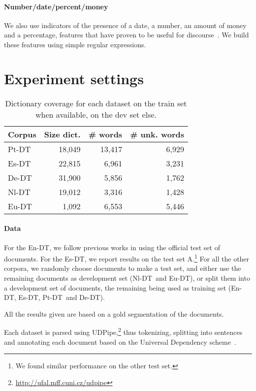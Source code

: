 \documentclass[11pt]{article}
\newcommand{\erstdt}{En-DT}
\newcommand{\derst}{De-DT}
\newcommand{\ptrst}{Pt-DT}
\newcommand{\eurst}{Eu-DT}
\newcommand{\esrst}{Es-DT}
\newcommand{\durst}{Nl-DT}
\newcommand{\nlrst}{Nl-DT}
\begin{document}
\paragraph{Number/date/percent/money}
We also use  indicators of the presence of a date, a number, an amount of money and a percentage, features that have proven to be useful for discourse~\cite{pitler:automati:2009}. We build these features using simple regular expressions. 


\section{Experiment settings}
\label{sec:setting}




\begin{table}
\begin{tabular}{lrrr}
\toprule
Corpus & Size dict. & \# words & \# unk. words \\
\midrule
\ptrst &18,049& 13,417 & 6,929\\
\esrst &22,815& 6,961 & 3,231\\
\derst &31,900& 5,856 & 1,762\\
\durst &19,012& 3,316 & 1,428\\
\eurst &1,092 & 6,553 & 5,446\\
\bottomrule
\end{tabular}
\caption{Dictionary coverage for each dataset on the train set when available, on the dev set else.}
\label{table:dictcoverage}
\end{table}

\paragraph{Data} For the \erstdt, we follow previous works in using the official test set of  documents. For the \esrst, we report results on the test set A.\footnote{We found similar performance on the other test set.} For all the other corpora, we randomly choose  documents to make a test set, and either use the remaining documents as development set (\nlrst\ and \eurst), or split them into a development set of  documents, the remaining being used as training set (\erstdt, \esrst, \ptrst\ and \derst).

All the results given are based on a gold segmentation of the documents.

Each dataset is parsed using UDPipe,\footnote{\url{http://ufal.mff.cuni.cz/udpipe}} thus tokenizing, splitting into sentences and annotating each document based on the Universal Dependency scheme~\cite{ud13}. 
\end{document}
